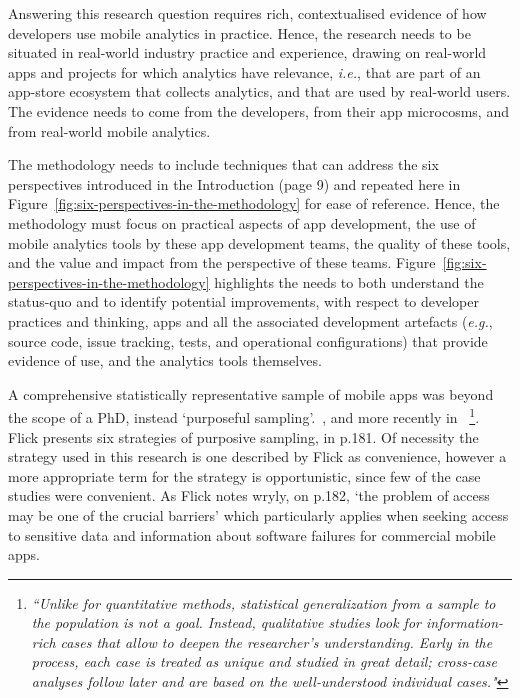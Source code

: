 Answering this research question requires rich, contextualised evidence of how developers use mobile analytics in practice.  Hence, the research needs to be situated in real-world industry practice and experience, drawing on real-world apps and projects for which analytics have relevance, \textit{i.e.}, that are part of an app-store ecosystem that collects analytics, and that are used by real-world users. The evidence needs to come from the developers, from their app microcosms, and from real-world mobile analytics.

The methodology needs to include techniques that can address the six perspectives introduced in the Introduction (page 9) and repeated here in Figure~\ref{fig:six-perspectives-in-the-methodology} for ease of reference.  Hence, the methodology must 
focus on practical aspects of app development, the use of mobile analytics tools by these app development teams, the quality of these tools, and the value and impact from the perspective of these teams.  Figure~\ref{fig:six-perspectives-in-the-methodology} highlights the needs to both understand the status-quo and to identify potential improvements, with respect to developer practices and thinking, apps and all the associated development artefacts (\textit{e.g.}, source code, issue tracking, tests, and operational configurations) that provide evidence of use, and the analytics tools themselves.


A comprehensive statistically representative sample of mobile apps was beyond the scope of a PhD, instead `purposeful sampling'.~\citep[pp180-182]{flick2018_an_introduction_to_qualitative_research_sixth_ed}, and more recently in ~\citep[p.114]{zieris2020_phd_qualitative_analysis_of_knowledge_transfer_in_pair_programming}\footnote{\emph{``Unlike for quantitative methods, statistical generalization from a sample to the population is not a goal. Instead, qualitative studies look for information-rich cases that allow to deepen the researcher’s understanding. Early in the process, each case is treated as unique and studied in great detail; cross-case analyses follow later and are based on the well-understood individual cases."}}. 
%
Flick presents six strategies of purposive sampling, in p.181. Of necessity the strategy used in this research is one described by Flick as convenience, however a more appropriate term for the strategy is opportunistic, since few of the case studies were convenient. As Flick notes wryly, on p.182, `the problem of access may be one of the crucial barriers' which particularly applies when seeking access to sensitive data and information about software failures for commercial mobile apps.

